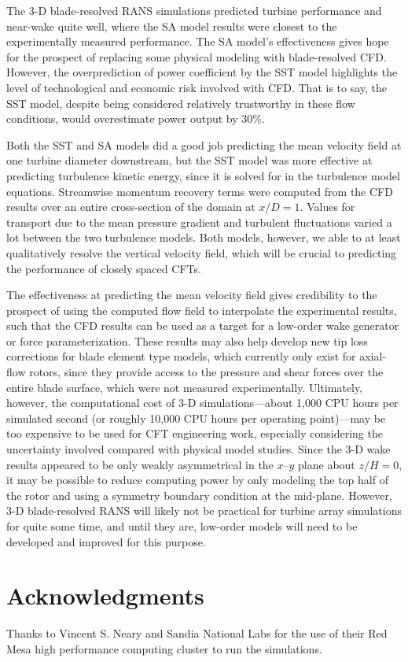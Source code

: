 The 3-D blade-resolved RANS simulations predicted turbine performance and
near-wake quite well, where the SA model results were closest to the
experimentally measured performance. The SA model's effectiveness gives hope for
the prospect of replacing some physical modeling with blade-resolved CFD.
However, the  overprediction of power coefficient by the SST model highlights
the level of technological and economic risk involved with CFD. That is to say,
the SST model, despite being considered relatively trustworthy in these flow
conditions, would overestimate power output by 30\%.

Both the SST and SA models did a good job predicting the mean velocity field at
one turbine diameter downstream, but the SST model was more effective at
predicting turbulence kinetic energy, since it is solved for in the turbulence
model equations. Streamwise momentum recovery terms were computed from the CFD
results over an entire cross-section of the domain at $x/D=1$. Values for
transport due to the mean pressure gradient and turbulent fluctuations varied a
lot between the two turbulence models. Both models, however, we able to at least
qualitatively resolve the vertical velocity field, which will be crucial to
predicting the performance of closely spaced CFTs.

The effectiveness at predicting the mean velocity field gives credibility to the
prospect of using the computed flow field to interpolate the experimental
results, such that the CFD results can be used as a target for a low-order wake
generator or force parameterization. These results may also help develop new tip
loss corrections for blade element type models, which currently only exist for
axial-flow rotors, since they provide access to the pressure and shear forces
over the entire blade surface, which were not measured experimentally.
Ultimately, however, the computational cost of 3-D simulations---about 1,000 CPU
hours per simulated second (or roughly 10,000 CPU hours per operating
point)---may be too expensive to be used for CFT engineering work, especially
considering the uncertainty involved compared with physical model studies. Since
the 3-D wake results appeared to be only weakly asymmetrical in the $x$--$y$
plane about $z/H=0$, it may be possible to reduce computing power by only
modeling the top half of the rotor and using a symmetry boundary condition at
the mid-plane. However, 3-D blade-resolved RANS will likely not be practical for
turbine array simulations for quite some time, and until they are, low-order
models will need to be developed and improved for this purpose.


\section{Acknowledgments}

Thanks to Vincent S. Neary and Sandia National Labs for the use of their Red
Mesa high performance computing cluster to run the simulations.

